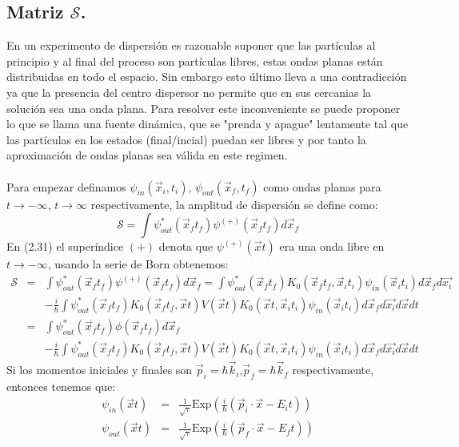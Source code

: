 \subsection{Matriz $\mathcal{S}$.}
En un experimento de dispersión es razonable suponer que las partículas al principio y al final del proceso son partículas libres, estas ondas planas están distribuidas en todo el espacio. Sin embargo esto último lleva a una contradicción ya que la presencia del centro dispersor no permite que en sus cercanias la solución sea una onda plana. Para resolver este inconveniente se puede proponer lo que se llama una fuente dinámica, que se "prenda y apague" lentamente tal que las partículas en los estados (final/incial) puedan ser libres y por tanto la aproximación de ondas planas sea válida en este regimen.\\
\\
Para empezar definamos $\psi_{in}(\vec{x}_i,t_i)$, $\psi_{out}(\vec{x}_f,t_f)$ como ondas planas para $t\to -\infty$,  $t\to \infty$ respectivamente, la amplitud de dispersión se define como:
\begin{equation}
\mathcal{S}=\int\psi_{out}^{*}(\vec{x}_{f}t_{f})\psi^{(+)}(\vec{x}_{f}t_{f})d\vec{x}_{f}
\end{equation}
En (2.31) el superíndice $(+)$ denota que $\psi^{(+)}(\vec{x}t)$ era una onda libre en $t\to -\infty$, usando la serie de Born obtenemos:
\begin{eqnarray}
\nonumber \mathcal{S}&=&\int\psi_{out}^{*}(\vec{x}_{f}t_{f})\psi^{(+)}(\vec{x}_{f}t_{f})d\vec{x}_{f}=\int\psi_{out}^{*}(\vec{x}_{f}t_{f})K_{0}(\vec{x}_{f}t_{f},\vec{x}_{i}t_{i})\psi_{in}(\vec{x}_{i}t_{i})d\vec{x}_{f}d\vec{x_{i}}\\
\nonumber &&-\frac{i}{\hbar}\int\psi_{out}^{*}(\vec{x}_{f}t_{f})K_{0}(\vec{x}_{f}t_{f},\vec{x}t)V(\vec{x}t)K_{0}(\vec{x}t,\vec{x}_{i}t_{i})\psi_{in}(\vec{x}_{i}t_{i})d\vec{x}_{f}d\vec{x_{i}}d\vec{x}dt\\
\nonumber &=&\int \psi_{out}^{*}(\vec{x}_{f}t_{f})\phi(\vec{x}_{f}t_{f})d\vec{x}_f\\
&&-\frac{i}{\hbar}\int\psi_{out}^{*}(\vec{x}_{f}t_{f})K_{0}(\vec{x}_{f}t_{f},\vec{x}t)V(\vec{x}t)K_{0}(\vec{x}t,\vec{x}_{i}t_{i})\psi_{in}(\vec{x}_{i}t_{i})d\vec{x}_{f}d\vec{x_{i}}d\vec{x}dt   
\end{eqnarray}
Si los momentos iniciales y finales son $\vec{p}_i=\hbar\vec{k}_i$,$\vec{p}_f=\hbar\vec{k}_f$ respectivamente, entonces tenemos que:
\begin{eqnarray}
\psi_{in}(\vec{x}t)&=&\frac{1}{\sqrt{\tau}}\text{Exp}\left( \frac{i}{\hbar}(\vec{p}_i\cdot \vec{x}-E_it )\right)\\
\psi_{out}(\vec{x}t)&=&\frac{1}{\sqrt{\tau}}\text{Exp}\left( \frac{i}{\hbar}(\vec{p}_f\cdot \vec{x}-E_ft )\right)
\end{eqnarray}
